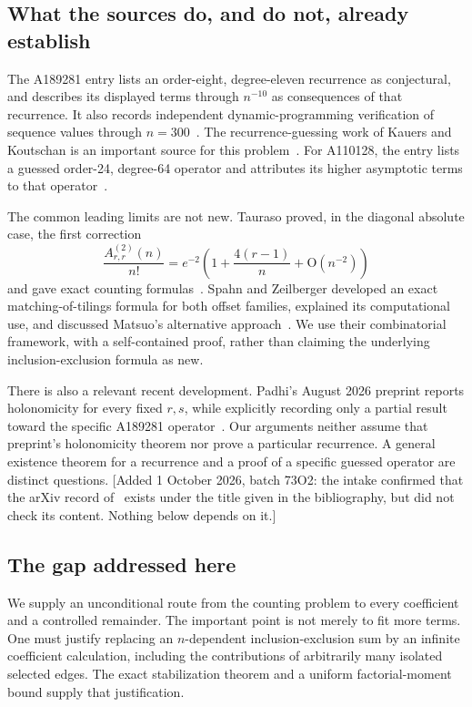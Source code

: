 \documentclass[11pt]{article}
\numberwithin{equation}{section}
\theoremstyle{definition}
\theoremstyle{remark}
\theoremstyle{definition}
\newcommand{\bigO}{\mathrm O}
\begin{document}
\subsection{What the sources do, and do not, already establish}

The A189281 entry lists an order-eight, degree-eleven recurrence as conjectural,
and describes its displayed terms through $n^{-10}$ as consequences of that
recurrence. It also records independent dynamic-programming verification of
sequence values through $n=300$~\cite{oeis189281}. The recurrence-guessing work of
Kauers and Koutschan is an important source for this problem~\cite{kauers}.
For A110128, the entry lists a guessed order-24, degree-64 operator and attributes
its higher asymptotic terms to that operator~\cite{oeis110128}.

The common leading limits are not new. Tauraso proved, in the diagonal absolute
case, the first correction
\begin{equation}
 \frac{A^{(2)}_{r,r}(n)}{n!}
 =e^{-2}\left(1+\frac{4(r-1)}n+\bigO(n^{-2})\right)
 \label{spf:eq:tauraso}
\end{equation}
and gave exact counting formulas~\cite{tauraso}. Spahn and Zeilberger developed
an exact matching-of-tilings formula for both offset families, explained its
computational use, and discussed Matsuo's alternative approach~\cite{spahn}.
We use their combinatorial framework, with a self-contained proof, rather than
claiming the underlying inclusion-exclusion formula as new.

There is also a relevant recent development. Padhi's August 2026 preprint
reports holonomicity for every fixed $r,s$, while explicitly recording only a
partial result toward the specific A189281 operator~\cite{padhi}. Our arguments
neither assume that preprint's holonomicity theorem nor prove a particular
recurrence. A general existence theorem for a recurrence and a proof of a
specific guessed operator are distinct questions.
[Added 1 October 2026, batch 73O2: the intake confirmed that the arXiv record
of~\cite{padhi} exists under the title given in the bibliography, but did not
check its content. Nothing below depends on it.]

\subsection{The gap addressed here}

We supply an unconditional route from the counting problem to every coefficient
and a controlled remainder. The important point is not merely to fit more
terms. One must justify replacing an $n$-dependent inclusion-exclusion sum by an
infinite coefficient calculation, including the contributions of arbitrarily
many isolated selected edges. The exact stabilization theorem and a uniform
factorial-moment bound supply that justification.
\end{document}
